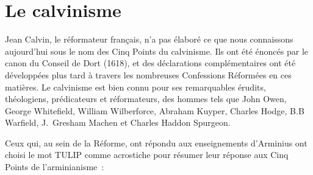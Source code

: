 \section{Le calvinisme}

 Jean Calvin, le réformateur français, n'a pas élaboré
 ce que nous connaissons aujourd'hui sous le nom des Cinq Points du calvinisme.
 Ils ont été énoncés par le canon du Conseil de Dort (1618), et des déclarations
 complémentaires ont été développées plus tard à travers les nombreuses
 Confessions Réformées en ces matières. Le calvinisme est bien connu
 pour 
 ses remarquables érudits, théologiens, prédicateurs et réformateurs,
 des hommes tels que John Owen, George Whitefield,
 William Wilberforce, Abraham Kuyper, Charles Hodge, B.B Warfield,
 J.~Gresham Machen et Charles Haddon Spurgeon.

Ceux qui, au sein de la Réforme, ont répondu aux enseignements d'Arminius
 ont choisi le mot \og TULIP \fg{} comme acrostiche pour résumer
 leur réponse aux Cinq Points de l'arminianisme~:

